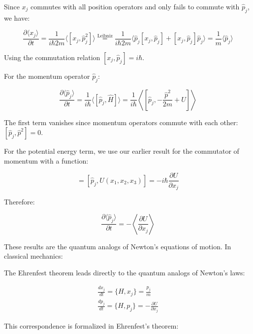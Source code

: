 \documentclass[10pt]{article}
\begin{document}
Since $x_j$ commutes with all position operators and only fails to commute with $\hat{p}_j$, we have:

\begin{equation*}
\frac{\partial\langle x_j\rangle}{\partial t} = \frac{1}{i\hbar 2m}\langle[x_j,\hat{p}_j^2]\rangle \stackrel{\text{Leibniz}}{=} \frac{1}{i\hbar 2m}\langle\hat{p}_j[x_j,\hat{p}_j]+[x_j,\hat{p}_j]\hat{p}_j\rangle = \frac{1}{m}\langle\hat{p}_j\rangle \tag{1.90}
\end{equation*}

Using the commutation relation $[x_j,\hat{p}_j] = i\hbar$.

For the momentum operator $\hat{p}_j$:

\begin{equation*}
\frac{\partial\langle\hat{p}_j\rangle}{\partial t} = \frac{1}{i\hbar}\langle[\hat{p}_j,\hat{H}]\rangle = \frac{1}{i\hbar}\left\langle\left[\hat{p}_j,-\frac{\hat{p}^2}{2m}+U\right]\right\rangle \tag{1.91}
\end{equation*}

The first term vanishes since momentum operators commute with each other: $[\hat{p}_j,\hat{p}^2] = 0$.

For the potential energy term, we use our earlier result for the commutator of momentum with a function:

\begin{equation*}
[\hat{p}_j,U] = [\hat{p}_j,U(x_1,x_2,x_3)] = -i\hbar\frac{\partial U}{\partial x_j} \tag{1.92}
\end{equation*}

Therefore:

\begin{equation*}
\frac{\partial\langle\hat{p}_j\rangle}{\partial t} = -\left\langle\frac{\partial U}{\partial x_j}\right\rangle \tag{1.93}
\end{equation*}

These results are the quantum analogs of Newton's equations of motion. In classical mechanics:


The Ehrenfest theorem leads directly to the quantum analogs of Newton's laws:

\[
\begin{array}{r}
\frac{dx_j}{dt} = \{H, x_j\} = \frac{p_j}{m} \\
\frac{dp_j}{dt} = \{H, p_j\} = -\frac{\partial U}{\partial x_j} \tag{1.94}
\end{array}
\]

This correspondence is formalized in Ehrenfest's theorem:
\end{document}
